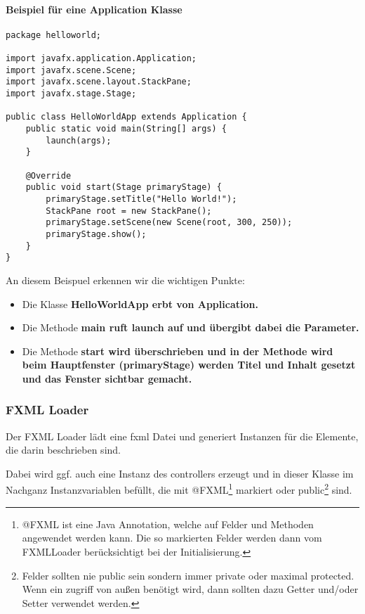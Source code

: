 \paragraph{Beispiel für eine Application Klasse}
 
\begin{lstlisting}
package helloworld;

import javafx.application.Application;
import javafx.scene.Scene;
import javafx.scene.layout.StackPane;
import javafx.stage.Stage;

public class HelloWorldApp extends Application {
    public static void main(String[] args) {
        launch(args);
    }

    @Override
    public void start(Stage primaryStage) {
        primaryStage.setTitle("Hello World!");
        StackPane root = new StackPane();
        primaryStage.setScene(new Scene(root, 300, 250));
        primaryStage.show();
    }
}
\end{lstlisting}

An diesem Beispuel erkennen wir die wichtigen Punkte:
\begin{itemize}

\item Die Klasse \bf{HelloWorldApp} erbt von Application.

\item Die Methode \bf{main} ruft launch auf und übergibt dabei die Parameter.

\item Die Methode \bf{start} wird überschrieben und in der Methode wird beim Hauptfenster (primaryStage) werden Titel
und Inhalt gesetzt und das Fenster sichtbar gemacht.
\end{itemize}

\subsubsection{FXML Loader}
Der FXML Loader lädt eine fxml Datei und generiert Instanzen für die Elemente, die darin beschrieben sind.

Dabei wird ggf. auch eine Instanz des controllers erzeugt und in dieser Klasse im Nachganz Instanzvariablen befüllt,
die mit @FXML\footnote{@FXML ist eine Java Annotation, welche auf Felder und Methoden angewendet werden kann. Die so
markierten Felder werden dann vom FXMLLoader berücksichtigt bei der Initialisierung.} markiert oder public\footnote{Felder
sollten nie public sein sondern immer private oder maximal protected. Wenn ein zugriff von außen benötigt wird, dann 
sollten dazu Getter und/oder Setter verwendet werden.} sind.

